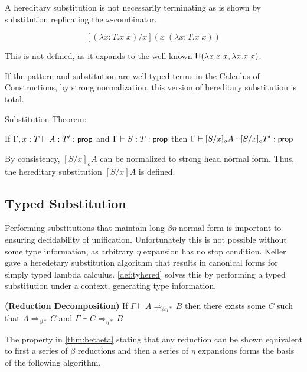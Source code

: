 A hereditary substitution is not necessarily terminating as is shown by
substitution replicating the $\omega$-combinator.

\[
[(\lambda x : T . x\; x) / x ] ( x \; (\lambda x : T. x\; x) )
\]

This is not defined, as it expands to the well known $\mathsf{H}(\lambda x . x \; x , \lambda x . x \; x)$.

If the pattern and substitution are well typed terms in the Calculus of Constructions, by 
strong normalization, this version of hereditary substitution is total.


\begin{theorem} Substitution Theorem:

If $\Gamma,x : T \vdash A : T' : \mathsf{prop}$  and $\Gamma \vdash S : T : \mathsf{prop}$ then
$ \Gamma \vdash [S/x]_o A : [S/x]_o T' : \mathsf{prop}$
\end{theorem}

By consistency, $[S/x]_o A $ can be normalized to strong head normal form.  Thus, the 
hereditary substitution $[S/x] A$ is defined.



\subsection{Typed Substitution}

Performing substitutions that maintain long $\beta\eta$-normal 
form is important to ensuring decidability of unification.  
Unfortunately this is not possible without some type information, 
as arbitrary $\eta$ expansion has no stop condition.
Keller \citep{keller2010normalization} gave a heredetary substitution algorithm
that results in canonical forms for simply typed lambda calculus. 
\ref{def:tyhered} solves this by performing a typed substitution under a context, 
generating type information.

\begin{theorem}
\textbf{(Reduction Decomposition)}
If $\Gamma \vdash A \Rightarrow_{\beta\eta*} B$ then there exists some $C$ such that
$A \Rightarrow_{\beta*} C$ and $\Gamma \vdash C \Rightarrow_{\eta*} B$

\label{thm:betaeta}
\end{theorem}

The property in \ref{thm:betaeta} stating that any reduction can be 
shown equivalent to first a series of $\beta$ reductions and then a series of
$\eta$ expansions forms the basis of the following algorithm.

